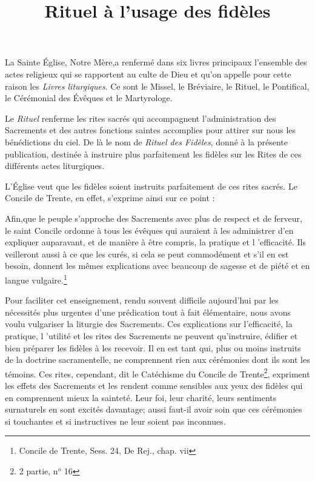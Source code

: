 \documentclass[%
fontsize=11,5%
,a5paper%
,DIV=15%
]{scrartcl}
\title{Rituel à l'usage des fidèles}
\author{}
\date{}
\begin{document}
\maketitle
\newpage
{}
La Sainte Église, Notre Mère,a renfermé dans six livres principaux
l'ensemble des actes religieux qui se rapportent au
culte de Dieu et qu'on appelle pour cette raison les \emph{Livres
liturgiques}. Ce sont le Missel, le Bréviaire, le Rituel, le Pontifical,
le Cérémonial des Évêques et le Martyrologe.

Le \emph{Rituel} renferme les rites sacrés qui accompagnent l'administration
des Sacrements et des autres fonctions saintes accomplies
pour attirer sur nous les bénédictions du ciel. De là
le nom de \emph{Rituel des Fidèles}, donné à la présente publication,
destinée à instruire plus parfaitement les fidèles sur les Rites
de ces différents actes liturgiques.

L'Église veut que les fidèles soient instruits parfaitement
de ces rites sacrés. Le Concile de Trente, en effet, s'exprime
ainsi sur ce point  :

\og Afin,que le peuple s'approche des Sacrements avec plus
de respect et de ferveur, le saint Concile ordonne à tous les
évêques qui auraient à les administrer d'en expliquer auparavant,
et de manière à être compris, la pratique et l 'efficacité.
Ils veilleront aussi à ce que les curés, si cela se peut commodément
et s'il en est besoin, donnent les mêmes explications avec
beaucoup de sagesse et de piété et en langue vulgaire.\fg \footnote{Concile de Trente, Sess. 24, De Rej., chap. vii}

Pour faciliter cet enseignement, rendu souvent difficile
aujourd'hui par les nécessités plus urgentes d'une prédication
tout à fait élémentaire, nous avons voulu vulgariser la liturgie
des Sacrements. Ces explications sur l'efficacité, la pratique,
l 'utilité et les rites des Sacrements ne peuvent qu'instruire,
édifier et bien préparer les fidèles à les recevoir. Il en est tant
qui, plus ou moins instruits de la doctrine sacramentelle, ne
comprennent rien aux cérémonies dont ils sont les témoins.
\og Ces rites, cependant, dit le Catéchisme du Concile de Trente\footnote{2\ieme{} partie, n$^o$ 16}, expriment les effets des Sacrements et les
rendent comme sensibles aux yeux des fidèles qui en comprennent mieux la sainteté. Leur foi, leur charité, leurs sentiments
surnaturels en sont excités davantage; aussi faut-il
avoir soin que ces cérémonies si touchantes et si instructives
ne leur soient pas inconnues.\fg
\end{document}
